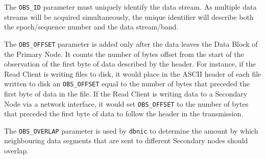 The {\tt OBS\_ID} parameter must uniquely identify the data stream.
As multiple data streams will be acquired simultaneously, the unique
identifier will describe both the epoch/sequence number and the data
stream/band.

The {\tt OBS\_OFFSET} parameter is added only after the data leaves
the Data Block of the Primary Node.  It counts the number of bytes
offset from the start of the observation of the first byte of data
described by the header.  For instance, if the Read Client is writing
files to disk, it would place in the ASCII header of each file written
to disk an {\tt OBS\_OFFSET} equal to the number of bytes that
preceded the first byte of data in the file.  If the Read Client is
writing data to a Secondary Node via a network interface, it would set
{\tt OBS\_OFFSET} to the number of bytes that preceded the first byte
of data to follow the header in the transmission.

The {\tt OBS\_OVERLAP} parameter is used by {\tt dbnic} to determine
the amount by which neighbouring data segments that are sent to
different Secondary nodes should overlap.


